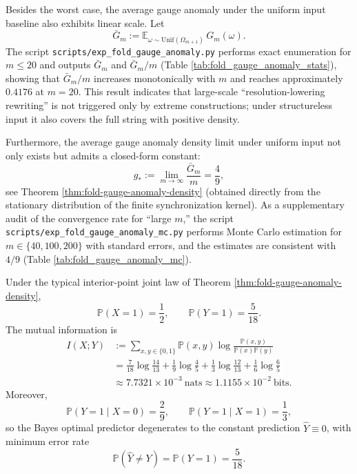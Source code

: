 \begin{remark}\label{rem:fold-gauge-anomaly-typical}
Besides the worst case, the average gauge anomaly under the uniform input baseline also exhibits linear scale.
Let
$$
\bar G_m:=\mathbb{E}_{\omega\sim\mathrm{Unif}(\Omega_{m+1})}\,G_m(\omega).
$$
The script \texttt{scripts/exp\_fold\_gauge\_anomaly.py} performs exact enumeration for \(m\le 20\) and outputs \(\bar G_m\) and \(\bar G_m/m\) (Table \ref{tab:fold_gauge_anomaly_stats}), showing that \(\bar G_m/m\) increases monotonically with \(m\) and reaches approximately \(0.4176\) at \(m=20\).
This result indicates that large-scale ``resolution-lowering rewriting'' is not triggered only by extreme constructions; under structureless input it also covers the full string with positive density.
\par
Furthermore, the average gauge anomaly density limit under uniform input not only exists but admits a closed-form constant:
\[
g_\ast:=\lim_{m\to\infty}\frac{\bar G_m}{m}=\frac49,
\]
see Theorem \ref{thm:fold-gauge-anomaly-density} (obtained directly from the stationary distribution of the finite synchronization kernel).
As a supplementary audit of the convergence rate for ``large \(m\),'' the script \texttt{scripts/exp\_fold\_gauge\_anomaly\_mc.py} performs Monte Carlo estimation for \(m\in\{40,100,200\}\) with standard errors, and the estimates are consistent with \(4/9\) (Table \ref{tab:fold_gauge_anomaly_mc}).
\end{remark}





\iffalse
\begin{corollary}\label{cor:fold-gauge-anomaly-mi}
Under the typical interior-point joint law of Theorem \ref{thm:fold-gauge-anomaly-density},
\[
\mathbb P(X=1)=\frac12,\qquad \mathbb P(Y=1)=\frac{5}{18}.
\]
The mutual information is
\begin{align}
I(X;Y)&:=\sum_{x,y\in\{0,1\}}\mathbb P(x,y)\log\frac{\mathbb P(x,y)}{\mathbb P(x)\mathbb P(y)}\nonumber\\
&=\frac{7}{18}\log\frac{14}{13}+\frac{1}{9}\log\frac{4}{5}+\frac{1}{3}\log\frac{12}{13}+\frac{1}{6}\log\frac{6}{5}\nonumber\\
&\approx 7.7321\times 10^{-3}\ \text{nats}\approx 1.1155\times 10^{-2}\ \text{bits}.
\end{align}
Moreover,
\[
\mathbb P(Y=1\mid X=0)=\frac{2}{9},\qquad \mathbb P(Y=1\mid X=1)=\frac{1}{3},
\]
so the Bayes optimal predictor degenerates to the constant prediction \(\widehat Y\equiv 0\), with minimum error rate
\[
\mathbb P(\widehat Y\neq Y)=\mathbb P(Y=1)=\frac{5}{18}.
\]
\end{corollary}

